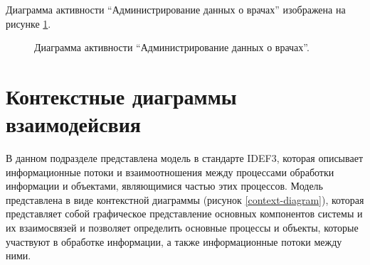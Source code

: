 \documentclass[14pt]{extreport}
\begin{document}
        Диаграмма активности “Администрирование данных о врачах” изображена %
        на рисунке \ref{diagram-doctor-admin}.
        \begin{figure}[H]%
            \centering
            \caption{Диаграмма активности “Администрирование данных о врачах”.} \label{diagram-doctor-admin}
        \end{figure} 
    
    \section{Контекстные диаграммы взаимодейсвия}
        В данном подразделе представлена модель в стандарте IDEF3, которая %
        описывает информационные потоки и взаимоотношения между процессами %
        обработки информации и объектами, являющимися частью этих процессов. %
        Модель представлена в виде контекстной диаграммы (рисунок \ref{context-diagram}), которая %
        представляет собой графическое представление основных компонентов системы и %
        их взаимосвязей и позволяет определить основные процессы и объекты, которые %
        участвуют в обработке информации, а также информационные потоки между ними. %
        
\end{document}
